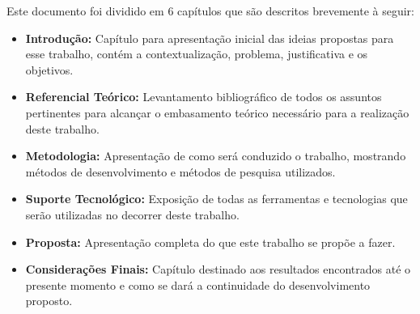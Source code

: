 Este documento foi dividido em 6 capítulos que são descritos brevemente à seguir:

\begin{itemize}
	\item \textbf{Introdução:} Capítulo para apresentação inicial das ideias propostas para esse trabalho, contém a contextualização, problema, justificativa e os objetivos.
	\item \textbf{Referencial Teórico:} Levantamento bibliográfico de todos os assuntos pertinentes para alcançar o embasamento teórico necessário para a realização deste trabalho.
	\item \textbf{Metodologia:} Apresentação de como será conduzido o trabalho, mostrando métodos de desenvolvimento e métodos de pesquisa utilizados.
	\item \textbf{Suporte Tecnológico:} Exposição de todas as ferramentas e tecnologias que serão utilizadas no decorrer deste trabalho.
	\item \textbf{Proposta:} Apresentação completa do que este trabalho se propõe a fazer.
	\item \textbf{Considerações Finais:} Capítulo destinado aos resultados encontrados até o presente momento e como se dará a continuidade do desenvolvimento proposto.
\end{itemize}
